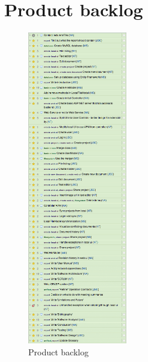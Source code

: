 \section{Product backlog}
\label{sec:productbacklog}

\begin{figure}[htb]
	\centering
	\includegraphics[width=0.385\textwidth]{Appendices/graphics/product_backlog.png}
	\caption{Product backlog}
	\label{fig:product-backlog}
\end{figure}